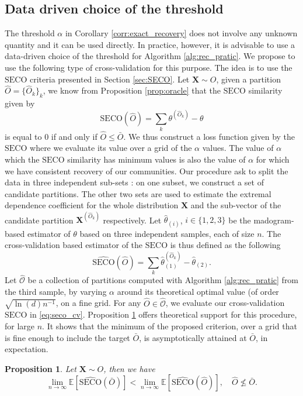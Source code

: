 \documentclass[11pt]{article}
\newcommand{\SECO}{\mathrm{SECO}}
\newtheorem{proposition}{Proposition}
\begin{document}
	\subsection{Data driven choice of the threshold}
	
	The threshold $\alpha$ in Corollary \ref{corr:exact_recovery} does not involve any unknown quantity and it can be used directly. In practice, however, it is advisable to use a data-driven choice of the threshold for Algorithm \ref{alg:rec_pratic}. We propose to use the following type of cross-validation for this purpose. The idea is to use the $\SECO$ criteria presented in Section \ref{sec:SECO}. Let $\textbf{X} \sim O$, given a partition $\hat{O} = \{ \hat{O}_k \}_k$, we know from Proposition \ref{prop:oracle} that the $\SECO$ similarity given by
	\begin{equation*}
		\SECO(\hat{O}) = \sum_{k} \theta^{(\hat{O}_k)} - \theta
	\end{equation*}
	is equal to $0$ if and only if $\hat{O} \leq \bar{O}$. We thus construct a loss function given by the $\SECO$ where we evaluate its value over a grid of the $\alpha$ values. The value of $\alpha$ which the $\SECO$ similarity has minimum values is also the value of $\alpha$ for which we have consistent recovery of our communities. Our procedure ask to split the data in three independent sub-sets : on one subset, we construct a set of candidate partitions. The other two sets are used to estimate the extremal dependence coefficient for the whole distribution $\textbf{X}$ and the sub-vector of the candidate partition $\textbf{X}^{(\hat{O}_k)}$ respectively. Let $\hat{\theta}_{(i)}$, $i \in \{1,2,3\}$ be the madogram-based estimator of $\theta$ based on three independent samples, each of size $n$. The cross-validation based estimator of the $\SECO$ is thus defined as the following
	\begin{equation}
		\label{eq:seco_cv}
		\widehat{\SECO}(\hat{O}) = \sum_{k} \hat{\theta}^{(\hat{O}_k)}_{(1)} - \hat{\theta}_{(2)}.
	\end{equation}
	Let $\widehat{\mathcal{O}}$ be a collection of partitions computed with Algorithm \ref{alg:rec_pratic} from the third sample, by varying $\alpha$ around its theoretical optimal value (of order $\sqrt{\ln(d) n^{-1}}$, on a fine grid. For any $\hat{O} \in \widehat{\mathcal{O}}$, we evaluate our cross-validation $\SECO$ in \eqref{eq:seco_cv}. Proposition \ref{prop:cv} offers theoretical support for this procedure, for large $n$. It shows that the minimum of the proposed criterion, over a grid that is fine enough to include the target $\bar{O}$, is asymptotically attained at $\bar{O}$, in expectation.
	\begin{proposition}
	\label{prop:cv}
		Let $\textbf{X} \sim O$, then we have
		\begin{equation*}
			\underset{n \rightarrow \infty}{\lim} \mathbb{E}\left[ \widehat{\SECO}(\bar{O}) \right] < \underset{n \rightarrow \infty}{\lim} \mathbb{E}\left[ \widehat{\SECO}(\hat{O})\right], \quad \hat{O} \not\leq \bar{O}.
		\end{equation*}
	\end{proposition}	
	
\end{document}
